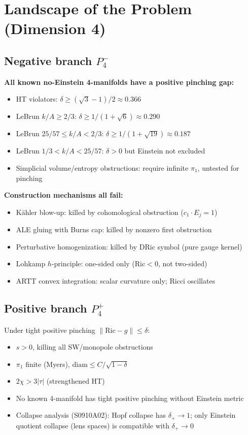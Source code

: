 \section{Landscape of the Problem (Dimension 4)}

\subsection{Negative branch $P_4^-$}

\textbf{All known no-Einstein 4-manifolds have a positive pinching gap:}
\begin{itemize}
\item HT violators: $\delta \geq (\sqrt{3}-1)/2 \approx 0.366$
\item LeBrun $k/A \geq 2/3$: $\delta \geq 1/(1+\sqrt{6}) \approx 0.290$
\item LeBrun $25/57 \leq k/A < 2/3$: $\delta \geq 1/(1+\sqrt{19}) \approx 0.187$
\item LeBrun $1/3 < k/A < 25/57$: $\delta > 0$ but Einstein not excluded
\item Simplicial volume/entropy obstructions: require infinite $\pi_1$, untested for pinching
\end{itemize}

\textbf{Construction mechanisms all fail:}
\begin{itemize}
\item K\"ahler blow-up: killed by cohomological obstruction ($c_1 \cdot E_j = 1$)
\item ALE gluing with Burns cap: killed by nonzero first obstruction
\item Perturbative homogenization: killed by DRic symbol (pure gauge kernel)
\item Lohkamp $h$-principle: one-sided only ($\mathrm{Ric} < 0$, not two-sided)
\item ARTT convex integration: scalar curvature only; Ricci oscillates
\end{itemize}

\subsection{Positive branch $P_4^+$}

Under tight positive pinching $\|\mathrm{Ric}-g\| \leq \delta$:
\begin{itemize}
\item $s > 0$, killing all SW/monopole obstructions
\item $\pi_1$ finite (Myers), $\mathrm{diam} \leq C/\sqrt{1-\delta}$
\item $2\chi > 3|\tau|$ (strengthened HT)
\item No known 4-manifold has tight positive pinching without Einstein metric
\item Collapse analysis (S0910A02): Hopf collapse has $\delta_+ \to 1$;
      only Einstein quotient collapse (lens spaces) is compatible with $\delta_+ \to 0$
\end{itemize}


